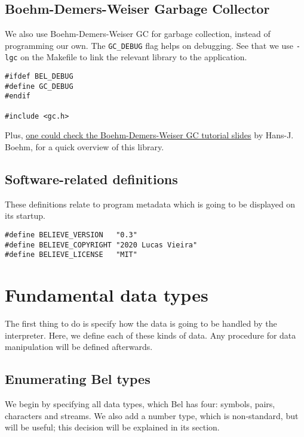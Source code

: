 \documentclass[openright,a4paper,twoside,12pt]{memoir}
\begin{document}
\section{Boehm-Demers-Weiser Garbage Collector}
\label{sec:org3fab577}

We also use Boehm-Demers-Weiser GC for garbage collection, instead of
programming our own. The \texttt{GC\_DEBUG} flag helps on debugging. See that we
use \texttt{-lgc} on the Makefile to link the relevant library to the
application.

\begin{verbatim}
#ifdef BEL_DEBUG
#define GC_DEBUG
#endif

#include <gc.h>
\end{verbatim}

Plus, \href{https://www.hboehm.info/gc/04tutorial.pdf}{one could check the Boehm-Demers-Weiser GC tutorial slides} by
Hans-J. Boehm, for a quick overview of this library.

\section{Software-related definitions}
\label{sec:orgd9c1868}

These definitions relate to program metadata which is going to be
displayed on its startup.

\begin{verbatim}
#define BELIEVE_VERSION   "0.3"
#define BELIEVE_COPYRIGHT "2020 Lucas Vieira"
#define BELIEVE_LICENSE   "MIT"
\end{verbatim}

\chapter{Fundamental data types}
\label{sec:orgef708d9}

The first thing to do is specify how the data is going to be handled
by the interpreter. Here, we define each of these kinds of data. Any
procedure for data manipulation will be defined afterwards.

\section{Enumerating Bel types}
\label{sec:org067ee03}

We begin by specifying all data types, which Bel has four: symbols,
pairs, characters and streams. We also add a number type, which is
non-standard, but will be useful; this decision will be explained in
its section.
\end{document}
